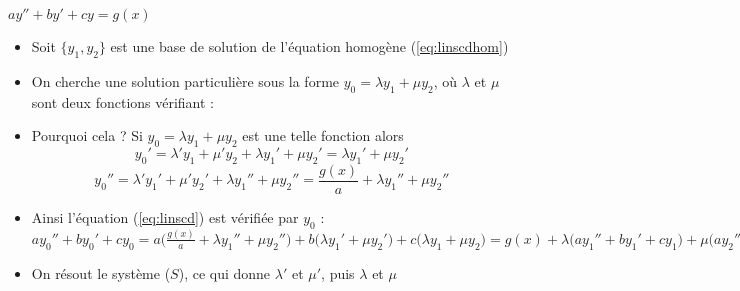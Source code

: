 \begin{frame}
 \quad $ay''+by'+cy=g(x)$


\pause
\begin{itemize}
  \item Soit $\{y_1,y_2\}$ est une base de solution de l'équation homogène (\ref{eq:linscdhom})
 \pause 
  \item On cherche une solution particulière sous la forme 
$y_0= \lambda y_1 + \mu y_2$, où $\lambda$ et $\mu$ sont deux fonctions 
vérifiant :
\pause  
  \item Pourquoi cela ?
Si $y_0= \lambda y_1 + \mu y_2$ est une telle fonction alors
$$y_0'= \lambda' y_1 + \mu' y_2 + \lambda y_1' + \mu y_2' = \lambda y_1'+ \mu y_2'$$
\vspace*{-2ex}
$$y_0'' = \lambda' y_1'+ \mu' y_2' + \lambda y_1''+ \mu y_2'' = \frac{g(x)}{a} + \lambda y_1''+ \mu y_2''$$
\pause\vspace*{-2ex}
  \item Ainsi l'équation (\ref{eq:linscd}) est vérifiée par $y_0$ :
$ay_0''+by_0'+cy_0= a\big(\frac{g(x)}{a} + \lambda y_1''+ \mu y_2''\big) + b\big(\lambda y_1'+ \mu y_2'\big) + c\big(\lambda y_1 + \mu y_2\big)
= g(x) + \lambda\big(ay_1''+by_1'+cy_1\big) + \mu\big(ay_2''+by_2'+cy_2\big)= g(x)$
\pause
  \item On résout le système ($S$), 
  ce qui donne $\lambda'$ et $\mu'$, 
puis $\lambda$ et $\mu$
\end{itemize}







\end{frame}

